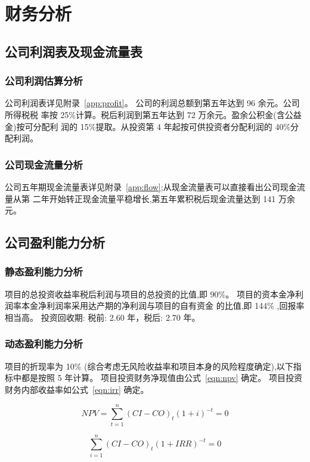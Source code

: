 \chapter{财务分析}
\section{公司利润表及现金流量表}

\subsection{公司利润估算分析}
公司利润表详见附录~\ref{app:profit}。
公司的利润总额到第五年达到 96 余元。公司所得税税
率按 25\%计算。税后利润到第五年达到 72 万余元。盈余公积金(含公益金)按可分配利
润的 15\%提取。从投资第 4 年起按可供投资者分配利润的 40\%分配利润。

\subsection{公司现金流量分析}
公司五年期现金流量表详见附录~\ref{app:flow};从现金流量表可以直接看出公司现金流量从第
二年开始转正现金流量平稳增长,第五年累积税后现金流量达到 141 万余元。

\section{公司盈利能力分析}
\subsection{静态盈利能力分析}
项目的总投资收益率税后利润与项目的总投资的比值,即 90\%。
项目的资本金净利润率本金净利润率采用达产期的净利润与项目的自有资金
的比值,即 144\% ,回报率相当高。
投资回收期: 税前: 2.60 年，税后: 2.70 年。

\subsection{动态盈利能力分析}
项目的折现率为 10\% (综合考虑无风险收益率和项目本身的风险程度确定),以下指
标中都是按照 5 年计算。
项目投资财务净现值由公式~\eqref{eqn:npv} 确定。
项目投资财务内部收益率如公式~\eqref{eqn:irr} 确定。

\begin{equation}
        \label{eqn:npv}
        NPV = \sum _{t = 1}^{n} (CI - CO)_{t} (1 + i)^{-t} = 0
\end{equation}

\begin{equation}
        \label{eqn:irr}
        \sum _{i = 1}^{n} (CI - CO)_{t} (1 + IRR)^{-t} = 0
\end{equation}

